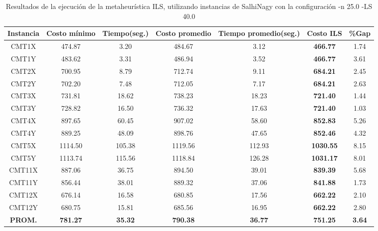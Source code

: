 \begin{table}[ht]
\caption{Resultados de la ejecución de la metaheurística ILS, utilizando instancias de SalhiNagy con la configuración -n 25.0 -LS 40.0}
\centering
\small
\begin{tabular}{c c c c c c c}
\hline\hline
Instancia & Costo mínimo & Tiempo(seg.) & Costo promedio & Tiempo promedio(seg.) & Costo ILS & \%Gap \\ [0.5ex]
\hline
CMT1X & 474.87 & 3.20 & 
484.67 & 3.12 & \bf{466.77} & 
1.74\\CMT1Y & 483.62 & 3.31 & 
486.94 & 3.52 & \bf{466.77} & 
3.61\\CMT2X & 700.95 & 8.79 & 
712.74 & 9.11 & \bf{684.21} & 
2.45\\CMT2Y & 702.20 & 7.48 & 
712.05 & 7.17 & \bf{684.21} & 
2.63\\CMT3X & 731.81 & 18.62 & 
738.23 & 18.23 & \bf{721.40} & 
1.44\\CMT3Y & 728.82 & 16.50 & 
736.32 & 17.63 & \bf{721.40} & 
1.03\\CMT4X & 897.65 & 60.45 & 
907.02 & 58.60 & \bf{852.83} & 
5.26\\CMT4Y & 889.25 & 48.09 & 
898.76 & 47.65 & \bf{852.46} & 
4.32\\CMT5X & 1114.50 & 105.38 & 
1119.56 & 112.93 & \bf{1030.55} & 
8.15\\CMT5Y & 1113.74 & 115.56 & 
1118.84 & 126.28 & \bf{1031.17} & 
8.01\\CMT11X & 887.06 & 36.75 & 
894.50 & 39.01 & \bf{839.39} & 
5.68\\CMT11Y & 856.44 & 38.01 & 
889.32 & 37.06 & \bf{841.88} & 
1.73\\CMT12X & 676.14 & 16.58 & 
680.85 & 17.56 & \bf{662.22} & 
2.10\\CMT12Y & 680.75 & 15.81 & 
685.56 & 16.95 & \bf{662.22} & 
2.80\\\bf{PROM.} & 
\bf{781.27} & \bf{35.32} & \bf{790.38} & \bf{36.77} & \bf{751.25} & \bf{3.64}\\[1ex]\hline
\end{tabular}
\label{table:nonlin}
\end{table} \clearpage
